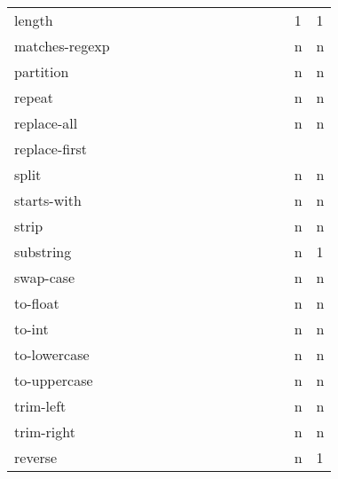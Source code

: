 \documentclass[anonymous,sigplan,review,11pt,nonacm,natbib=false]{acmart}
\begin{document}
\begin{table*}
\begin{tabular}{lllllllllllllll}
            length &  &  &  &  &  &  &  &  &  &  &  &  & 1 & 1 \\

            matches-regexp &  &  &  &  &  &  &  &  &  &  &  &  & n & n \\

            partition &  &  &  &  &  &  &  &  &  &  &  &  & n & n \\

            repeat &  &  &  &  &  &  &  &  &  &  &  &  & n & n \\

            replace-all &  &  &  &  &  &  &  &  &  &  &  &  & n & n \\

            replace-first &  &  &  &  &  &  &  &  &  &   &  &  &  & \\

            split &  &  &  &  &  &  &  &  &  &  &  &  & n & n \\

            starts-with &  &  &  &  &  &  &  &  &  &  &  &  & n & n \\

            strip &  &  &  &  &  &  &  &  &  &  &  &  & n & n \\

            substring &  &  &  &  &  &  &  &  &  &  &  &  & n & 1 \\

            swap-case &  &  &  &  &  &  &  &  &  &  &  &  & n & n \\

            to-float &  &  &  &  &  &  &  &  &  &  &  &  & n & n \\

            to-int &  &  &  &  &  &  &  &  &  &  &  &  & n & n \\

            to-lowercase &  &  &  &  &  &  &  &  &  &  &  &  & n & n \\

            to-uppercase &  &  &  &  &  &  &  &  &  &  &  &  & n & n \\

            trim-left &  &  &  &  &  &  &  &  &  &  &  &  & n & n \\

            trim-right &  &  &  &  &  &  &  &  &  &  &  &  & n & n \\

            reverse &  &  &  &  &  &  &  &  &  &  &  &  & n & 1 \\


\end{tabular}
\end{table*}
\end{document}
